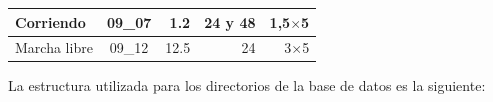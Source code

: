 \begin{table}[H]
\begin{tabular}{|l|c|r|r|r|}
Corriendo                                                                        & 09\_07                     & 1.2                                                                                    & 24 y 48                      &1,5$\times $5                                                                              \\ \hline
Marcha libre                                                                     & 09\_12                     & 12.5                                                                                   & 24                           &3$\times $5                                                                              \\ \hline
\end{tabular}
\end{table}


La estructura utilizada para los directorios de la base de datos es la siguiente:


